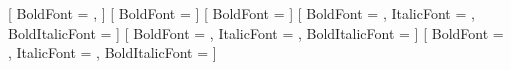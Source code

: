 \RequirePackage[fontset=none,scheme=plain]{ctex}

\setCJKmainfont{\BOOK@serifCn}[
    BoldFont = \BOOK@serifCnBold,
]
\setCJKsansfont{\BOOK@sansCn}[
    BoldFont = \BOOK@sansCnBold
]
\setCJKmonofont{\BOOK@monoCn}[
    BoldFont = \BOOK@monoCnBold
]
\setmainfont{\BOOK@serif}[
    BoldFont = \BOOK@serifBold,
    ItalicFont = \BOOK@serifItalic,
    BoldItalicFont = \BOOK@serifBoldItalic
]
\setsansfont{\BOOK@sans}[
    BoldFont = \BOOK@sansBold,
    ItalicFont = \BOOK@sansItalic,
    BoldItalicFont = \BOOK@sansBoldItalic
]
\setmonofont{\BOOK@mono}[
    BoldFont = \BOOK@monoBold,
    ItalicFont = \BOOK@monoItalic,
    BoldItalicFont = \BOOK@monoBoldItalic
]


\newcommand*\kaishu{\CJKfamily{kaishu}}
\newcommand*\fangsong{\CJKfamily{fangsong}}